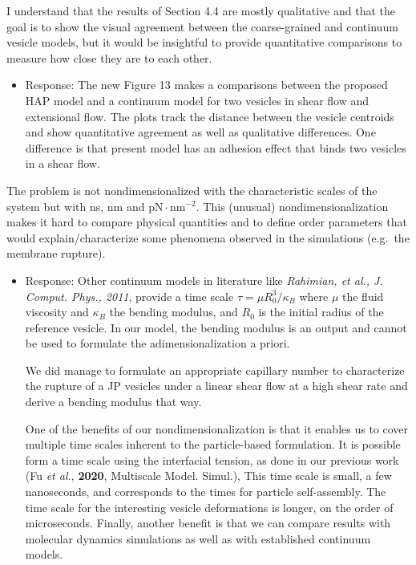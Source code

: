 \documentclass[11pt]{article}
\newcommand{\comment}[1]{{\color{blue} #1}}
\begin{document}
\noindent
\comment{I understand that the results of Section 4.4 are mostly
qualitative and that the goal is to show the visual agreement between
the coarse-grained and continuum vesicle models, but it would be
insightful to provide quantitative comparisons to measure how close they
are to each other.}
\begin{itemize}
  
\item Response: The new Figure 13
  makes a comparisons between the proposed HAP model and a continuum model for two vesicles
  in shear flow and extensional flow.
  The plots track the distance between the vesicle centroids 
  and show quantitative agreement as well as qualitative differences.
  One difference is that present model has an adhesion effect that
  binds two vesicles in a shear flow.  
\end{itemize}

\noindent
\comment{The problem is not nondimensionalized with the characteristic
scales of the system but with ns, nm and $\text{pN} \cdot
\text{nm}^{-2}$. This (unusual) nondimensionalization makes it hard to
compare physical quantities and to define order parameters that would
explain/characterize some phenomena observed in the simulations
(e.g.~the membrane rupture).}

\begin{itemize}
  \item Response:
Other continuum models in literature
like  \emph{Rahimian, et al., J. Comput. Phys., 2011}, 
 provide a time scale $\tau = \mu R_0^3/\kappa_B$ where $\mu$ the fluid
    viscosity and $\kappa_B$ the bending modulus, and 
    $R_0$ is the initial radius of the reference vesicle.
    In our model, the bending modulus is an output and cannot be used
    to formulate the adimensionalization a priori.

    We did manage to formulate an appropriate capillary number to characterize the rupture of a JP vesicles
    under a linear shear flow at a high shear rate and derive a bending modulus that way. 
    
    One of the benefits of our nondimensionalization is that it enables
    us to cover multiple time scales inherent to the particle-based formulation. 
    It is possible form a time scale using the interfacial tension, as done
    in our previous work (Fu {\sl et al.}, {\bf 2020}, Multiscale Model. Simul.),
    This time scale is small, a few nanoseconds, and
    corresponds to the times for particle self-assembly.
    The time scale for the interesting vesicle deformations is longer,
    on the order of microseconds.    
    Finally, another benefit is that we can compare
    results with molecular dynamics simulations
    as well as with established continuum models.  

\end{itemize}
\end{document}
